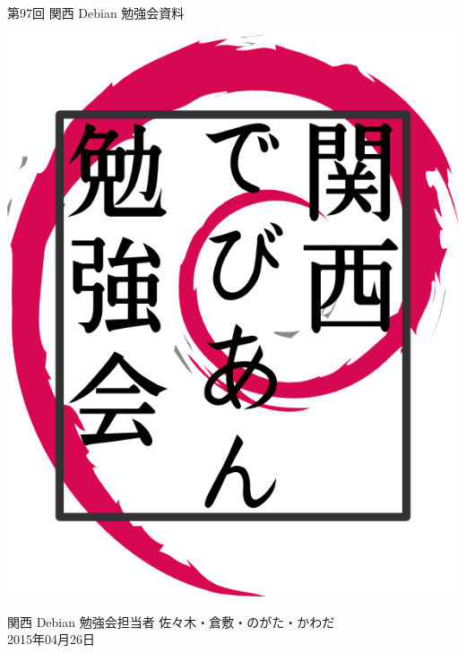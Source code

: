 \documentclass[mingoth,a4paper]{jsarticle}
\newcommand{\debmtgyear}{2015}
\newcommand{\debmtgdate}{26}
\newcommand{\debmtgmonth}{04}
\newcommand{\debmtgnumber}{97}
\begin{document}
\begin{titlepage}


 第\debmtgnumber{}回 関西 Debian 勉強会資料

\vspace{2cm}

\begin{center}
\includegraphics{image200802/kansaidebianlogo.png}
\end{center}

\begin{flushright}
\hfill{}関西 Debian 勉強会担当者 佐々木・倉敷・のがた・かわだ \\
\hfill{}\debmtgyear{}年\debmtgmonth{}月\debmtgdate{}日
\end{flushright}

\thispagestyle{empty}
\end{titlepage}


\vspace{1em}
\end{document}
